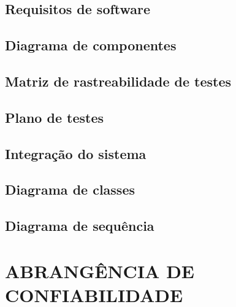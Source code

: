 \section{Requisitos de software}
\label{sec:reqsw}

\section{Diagrama de componentes}
\label{sec:diagcomp}

\section{Matriz de rastreabilidade de testes}
\label{sec:matrtest}

\section{Plano de testes}
\label{sec:plantest}

\section{Integração do sistema}
\label{sec:intsist}

\section{Diagrama de classes}
\label{sec:diagclas}

\section{Diagrama de sequência}
\label{sec:diagseq}

\chapter{ABRANGÊNCIA DE CONFIABILIDADE}
\label{chap:abrconf}

